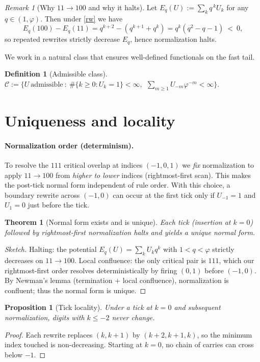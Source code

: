 \documentclass[11pt]{article}
\newtheorem{definition}{Definition}
\newtheorem{proposition}{Proposition}
\newtheorem{theorem}{Theorem}
\theoremstyle{remark}
\newtheorem{remark}{Remark}
\begin{document}
\begin{remark}[Why $11\!\to\!100$ and why it halts]
Let $E_q(U):=\sum_k q^{\,k}U_k$ for any $q\in(1,\varphi)$. Then under \eqref{rw} we have
\[
E_q(100)-E_q(11)=q^{k+2}-(q^{k+1}{+}q^k)=q^k(q^2-q-1)\ <\ 0,
\]
so repeated rewrites strictly decrease $E_q$, hence normalization halts.
\end{remark}

We work in a natural class that ensures well-defined functionals on the fast tail.

\begin{definition}[Admissible class]\label{def:class}
\(
\mathcal{C}
:=
\big\{U\ \text{admissible}\ :\
\#\{k\ge0:U_k=1\}<\infty,\ \ \sum_{m\ge1}U_{-m}\varphi^{-m}<\infty\big\}.
\)
\end{definition}

\section{Uniqueness and locality}

\paragraph{Normalization order (determinism).}
To resolve the $111$ critical overlap at indices $(-1,0,1)$ we \emph{fix} normalization to apply $11\!\to\!100$ from \emph{higher to lower} indices (rightmost-first scan).
This makes the post-tick normal form independent of rule order.
With this choice, a boundary rewrite across $(-1,0)$ can occur at the first tick only if $U_{-1}=1$ and $U_{1}=0$ just before the tick.

\begin{theorem}[Normal form exists and is unique]\label{thm:nf}
Each tick (insertion at $k=0$) followed by rightmost-first normalization halts and yields a unique normal form.
\end{theorem}
\begin{proof}[Sketch]
Halting: the potential $E_q(U)=\sum_k U_k q^k$ with $1<q<\varphi$ strictly decreases on $11\!\to\!100$.
Local confluence: the only critical pair is $111$, which our rightmost-first order resolves deterministically by firing $(0,1)$ before $(-1,0)$.
By Newman's lemma (termination $+$ local confluence), normalization is confluent; thus the normal form is unique.
\end{proof}

\begin{proposition}[Tick locality]\label{prop:local-fixed}
Under a tick at $k=0$ and subsequent normalization, digits with $k\le -2$ never change.
\end{proposition}
\begin{proof}
Each rewrite replaces $(k,k{+}1)$ by $(k{+}2,k{+}1,k)$, so the minimum index touched is non-decreasing.
Starting at $k=0$, no chain of carries can cross below $-1$.
\end{proof}
\end{document}
